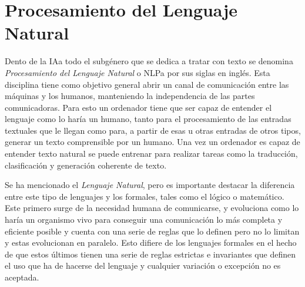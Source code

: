 


\section{Procesamiento del Lenguaje Natural}Dento de la \gls{IAa} todo el subgénero que
se dedica a tratar con texto se denomina \textit{Procesamiento del Lenguaje
Natural} o \gls{NLPa} por sus siglas en inglés. Esta disciplina tiene como
objetivo general abrir un canal de comunicación entre las máquinas y los
humanos, manteniendo la independencia de las partes comunicadoras. Para esto un
ordenador tiene que ser capaz de entender el lenguaje como lo haría un humano,
tanto para el procesamiento de las entradas textuales que le llegan como para, a
partir de esas u otras entradas de otros tipos, generar un texto comprensible
por un humano. Una vez un ordenador es capaz de entender texto natural se puede
entrenar para realizar tareas como la traducción, clasificación y generación
coherente de texto. \cite{StanfordSLP3}

Se ha mencionado el \textit{Lenguaje Natural}, pero es importante destacar la
diferencia entre este tipo de lenguajes y los formales, tales como el lógico o
matemático. Este primero surge de la necesidad humana de comunicarse, y
evoluciona como lo haría un organismo vivo para conseguir una comunicación lo
más completa y eficiente posible y cuenta con una serie de reglas que lo
definen pero no lo limitan y estas evolucionan en paralelo. Esto difiere de los
lenguajes formales en el hecho de que estos últimos tienen una serie de reglas
estrictas e invariantes que definen el uso que ha de hacerse del lenguaje y
cualquier variación o excepción no es aceptada.\cite{vasquez2009procesamiento}

